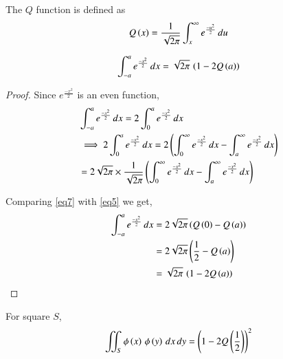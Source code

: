 \documentclass[journal,12pt,twocolumn]{IEEEtran}
\begin{document}
\begin{definition}
The $Q$ function is defined as
\begin{align}
    Q\left(x\right) = \frac{1}{\sqrt{2\pi}}\int_x^\infty e^{\frac{-u^2}{2}}\, du\label{eq5}
\end{align}
\end{definition}

\begin{lemma}
\begin{align}
    \int_{-a}^{a} e^{\frac{-x^2}{2}}\, dx = \sqrt{2\pi}\,\left(1-2Q\left(a\right)\right)\label{eq6}
\end{align}
\end{lemma}

\begin{proof}
Since $e^{\frac{-x^2}{2}}$ is an even function,
\begin{align}
    &\int_{-a}^{a} e^{\frac{-x^2}{2}}\, dx = 2\int_{0}^{a} e^{\frac{-x^2}{2}}\, dx\\
    &\implies 2\int_{0}^{a} e^{\frac{-x^2}{2}}\, dx = 2 \left(\int_{0}^{\infty} e^{\frac{-x^2}{2}}\, dx - \int_{a}^{\infty} e^{\frac{-x^2}{2}}\, dx\right) \nonumber\\
    &= 2\sqrt{2\pi} \times \frac{1}{\sqrt{2\pi}} \left(\int_{0}^{\infty} e^{\frac{-x^2}{2}}\, dx - \int_{a}^{\infty} e^{\frac{-x^2}{2}}\, dx\right) \label{eq7}
\end{align}

Comparing \eqref{eq7} with \eqref{eq5} we get,
\begin{align}
    \int_{-a}^{a} e^{\frac{-x^2}{2}}\, dx &= 2\sqrt{2\pi}\left(Q\left(0\right) - Q\left(a\right)\right)\\
    &= 2\sqrt{2\pi}\left(\frac{1}{2} - Q\left(a\right)\right)\\
    &= \sqrt{2\pi}\,\left(1 - 2Q\left(a\right)\right)
\end{align}
\end{proof}

\begin{lemma}
For square $S$,
\begin{align}
    \iint_S{\phi\left(x\right)\,\phi\left(y\right)\,dx\,dy} = \left(1-2Q\left(\frac{1}{2}\right)\right)^2 \label{eq10}
\end{align}
\end{lemma}
\end{document}

